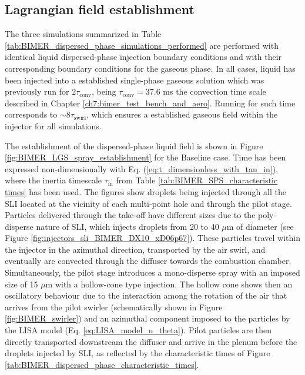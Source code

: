 \subsection{Lagrangian field establishment}

The three simulations summarized in Table \ref{tab:BIMER_dispersed_phase_simulations_performed} are performed with identical liquid dispersed-phase injection boundary conditions and with their corresponding boundary conditions for the gaseous phase. In all cases, liquid has been injected into a established single-phase gaseous solution which was previously run for $2 \tau_\mathrm{conv}$, being $\tau_\mathrm{conv} = 37.6$ ms the convection time scale described in Chapter \ref{ch7:bimer_test_bench_and_aero}. Running for such time corresponds to $\sim 8 \tau_\mathrm{swirl}$, which ensures a established gaseous field within the injector for all simulations.

The establishment of the dispersed-phase liquid field is shown in Figure \ref{fig:BIMER_LGS_spray_establishment} for the Baseline case. Time has been expressed non-dimensionally with Eq. (\ref{eq:t_dimensionless_with_tau_in}), where the inertia timescale $\tau_\mathrm{in}$ from Table \ref{tab:BIMER_SPS_characteristic times} has been used. The figures show droplets being injected through all the SLI located at the vicinity of each multi-point hole and through the pilot stage. Particles delivered through the take-off have different sizes due to the poly-disperse nature of SLI, which injects droplets from 20 to 40 $\mu$m of diameter (see Figure \ref{fig:injectors_sli_BIMER_DX10_xD06p67}). These particles travel within the injector in the azimuthal direction, transported by the air swirl, and eventually are convected through the diffuser towards the combustion chamber. Simultaneously, the pilot stage introduces a mono-disperse spray with an imposed size of 15 $\mu$m with a hollow-cone type injection. The hollow cone shows then an oscillatory behaviour due to the interaction among the rotation of the air that arrives from the pilot swirler (schematically shown in Figure \ref{fig:BIMER_swirler}) and an azimuthal component imposed to the particles by the LISA model (Eq. \ref{eq:LISA_model_u_theta}). Pilot particles are then directly transported downstream the diffuser and arrive in the plenum before the droplets injected by SLI, as reflected by the characteristic times of Figure \ref{tab:BIMER_dispersed_phase_characteristic_times}.

